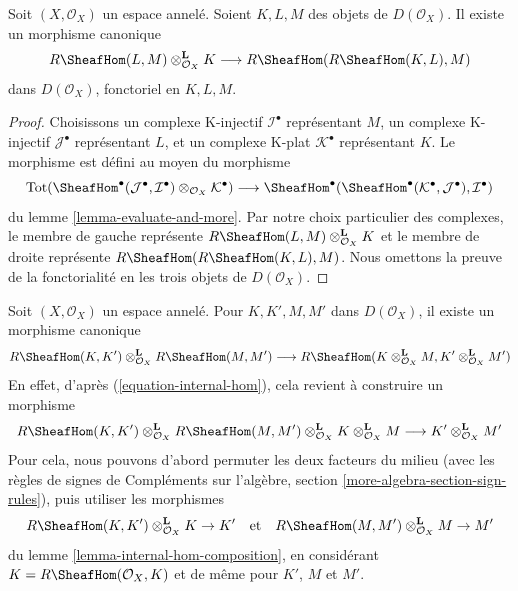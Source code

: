 {\begin{lemma}
\label{lemma-internal-hom-evaluate}
Soit $(X, \mathcal{O}_X)$ un espace annelé. Soient $K, L, M$ des objets de $D(\mathcal{O}_X)$. Il existe un morphisme canonique $$
R\SheafHom(L, M) \otimes_{\mathcal{O}_X}^\mathbf{L} K
\longrightarrow
R\SheafHom(R\SheafHom(K, L), M)
$$ dans $D(\mathcal{O}_X)$, fonctoriel en $K, L, M$.
\end{lemma}

\begin{proof}
Choisissons un complexe K-injectif $\mathcal{I}^\bullet$ représentant $M$, un complexe K-injectif $\mathcal{J}^\bullet$ représentant $L$, et un complexe K-plat $\mathcal{K}^\bullet$ représentant $K$. Le morphisme est défini au moyen du morphisme $$
\text{Tot}(\SheafHom^\bullet(\mathcal{J}^\bullet,
\mathcal{I}^\bullet) \otimes_{\mathcal{O}_X} \mathcal{K}^\bullet)
\longrightarrow
\SheafHom^\bullet(\SheafHom^\bullet(\mathcal{K}^\bullet,
\mathcal{J}^\bullet), \mathcal{I}^\bullet)
$$ du lemme \ref{lemma-evaluate-and-more}. Par notre choix particulier des complexes, le membre de gauche représente $R\SheafHom(L, M) \otimes_{\mathcal{O}_X}^\mathbf{L} K$ et le membre de droite représente $R\SheafHom(R\SheafHom(K, L), M)$. Nous omettons la preuve de la fonctorialité en les trois objets de $D(\mathcal{O}_X)$.
\end{proof}

\begin{remark}

\label{remark-tensor-internal-hom}

Soit $(X, \mathcal{O}_X)$ un espace annelé. Pour $K, K', M, M'$ dans
$D(\mathcal{O}_X)$, il existe un morphisme canonique
$$
R\SheafHom(K, K') \otimes_{\mathcal{O}_X}^\mathbf{L}
R\SheafHom(M, M')
\longrightarrow
R\SheafHom(K \otimes_{\mathcal{O}_X}^\mathbf{L} M,
K' \otimes_{\mathcal{O}_X}^\mathbf{L} M')
$$
En effet, d'après (\ref{equation-internal-hom}), cela revient à construire un morphisme
$$
R\SheafHom(K, K') \otimes_{\mathcal{O}_X}^\mathbf{L}
R\SheafHom(M, M') \otimes_{\mathcal{O}_X}^\mathbf{L}
K \otimes_{\mathcal{O}_X}^\mathbf{L} M
\longrightarrow
K' \otimes_{\mathcal{O}_X}^\mathbf{L} M'
$$
Pour cela, nous pouvons d'abord permuter les deux facteurs du milieu (avec les règles de signes de Compléments sur l'algèbre, section
\ref{more-algebra-section-sign-rules}), puis utiliser les morphismes
$$
R\SheafHom(K, K') \otimes_{\mathcal{O}_X}^\mathbf{L} K \to K'
\quad\text{et}\quad
R\SheafHom(M, M') \otimes_{\mathcal{O}_X}^\mathbf{L} M \to M'
$$
du lemme \ref{lemma-internal-hom-composition}, en considérant $K = R\SheafHom(\mathcal{O}_X, K)$ et de même pour
$K'$, $M$ et $M'$.


\end{remark}}
